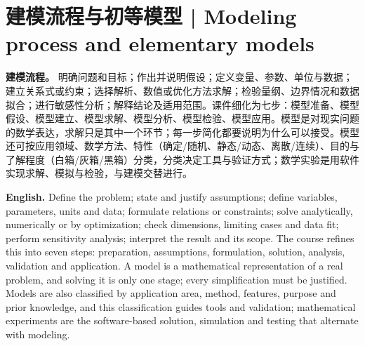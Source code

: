 \documentclass[UTF8,11pt,a4paper]{ctexart}
\newcommand{\EN}[1]{\par\noindent\textbf{English.} #1\par}
\begin{document}
\section{建模流程与初等模型 | Modeling process and elementary models}
\noindent\textbf{建模流程。} 明确问题和目标；作出并说明假设；定义变量、参数、单位与数据；建立关系式或约束；选择解析、数值或优化方法求解；检验量纲、边界情况和数据拟合；进行敏感性分析；解释结论及适用范围。课件细化为七步：模型准备、模型假设、模型建立、模型求解、模型分析、模型检验、模型应用。模型是对现实问题的数学表达，求解只是其中一个环节；每一步简化都要说明为什么可以接受。模型还可按应用领域、数学方法、特性（确定/随机、静态/动态、离散/连续）、目的与了解程度（白箱/灰箱/黑箱）分类，分类决定工具与验证方式；数学实验是用软件实现求解、模拟与检验，与建模交替进行。
\EN{Define the problem; state and justify assumptions; define variables, parameters, units and data; formulate relations or constraints; solve analytically, numerically or by optimization; check dimensions, limiting cases and data fit; perform sensitivity analysis; interpret the result and its scope. The course refines this into seven steps: preparation, assumptions, formulation, solution, analysis, validation and application. A model is a mathematical representation of a real problem, and solving it is only one stage; every simplification must be justified. Models are also classified by application area, method, features, purpose and prior knowledge, and this classification guides tools and validation; mathematical experiments are the software-based solution, simulation and testing that alternate with modeling.}
\end{document}
